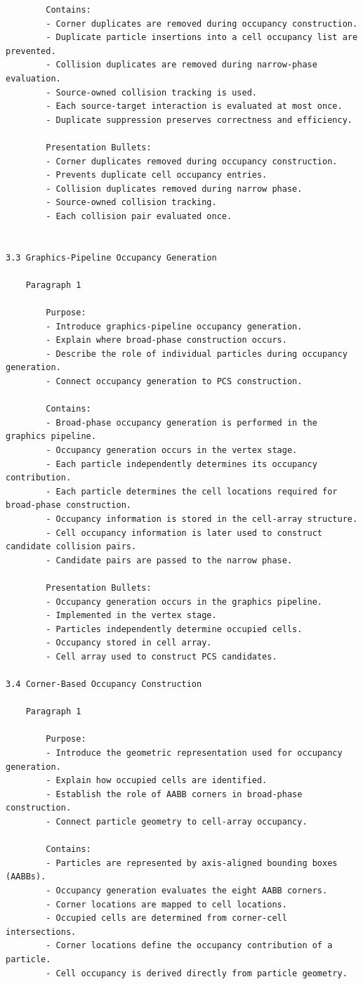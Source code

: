 \begin{verbatim}
		Contains:
		- Corner duplicates are removed during occupancy construction.
		- Duplicate particle insertions into a cell occupancy list are prevented.
		- Collision duplicates are removed during narrow-phase evaluation.
		- Source-owned collision tracking is used.
		- Each source-target interaction is evaluated at most once.
		- Duplicate suppression preserves correctness and efficiency.

		Presentation Bullets:
		- Corner duplicates removed during occupancy construction.
		- Prevents duplicate cell occupancy entries.
		- Collision duplicates removed during narrow phase.
		- Source-owned collision tracking.
		- Each collision pair evaluated once.


3.3 Graphics-Pipeline Occupancy Generation

	Paragraph 1

		Purpose:
		- Introduce graphics-pipeline occupancy generation.
		- Explain where broad-phase construction occurs.
		- Describe the role of individual particles during occupancy generation.
		- Connect occupancy generation to PCS construction.

		Contains:
		- Broad-phase occupancy generation is performed in the graphics pipeline.
		- Occupancy generation occurs in the vertex stage.
		- Each particle independently determines its occupancy contribution.
		- Each particle determines the cell locations required for broad-phase construction.
		- Occupancy information is stored in the cell-array structure.
		- Cell occupancy information is later used to construct candidate collision pairs.
		- Candidate pairs are passed to the narrow phase.

		Presentation Bullets:
		- Occupancy generation occurs in the graphics pipeline.
		- Implemented in the vertex stage.
		- Particles independently determine occupied cells.
		- Occupancy stored in cell array.
		- Cell array used to construct PCS candidates.

3.4 Corner-Based Occupancy Construction

	Paragraph 1

		Purpose:
		- Introduce the geometric representation used for occupancy generation.
		- Explain how occupied cells are identified.
		- Establish the role of AABB corners in broad-phase construction.
		- Connect particle geometry to cell-array occupancy.

		Contains:
		- Particles are represented by axis-aligned bounding boxes (AABBs).
		- Occupancy generation evaluates the eight AABB corners.
		- Corner locations are mapped to cell locations.
		- Occupied cells are determined from corner-cell intersections.
		- Corner locations define the occupancy contribution of a particle.
		- Cell occupancy is derived directly from particle geometry.


\end{verbatim}
